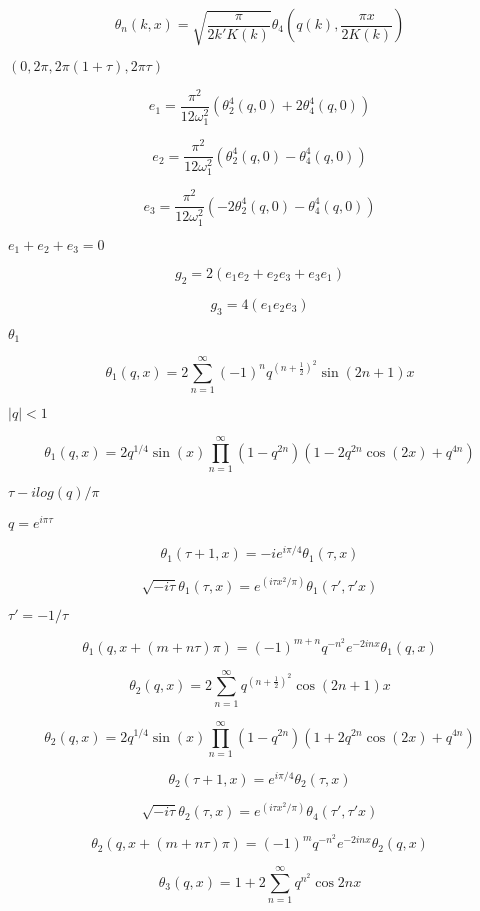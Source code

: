 \documentclass{article}
\begin{document}
\[ \theta_n(k,x) = \sqrt{\frac{\pi}{2k'K(k)}} \theta_4\left(q(k),\frac{\pi x}{2K(k)}\right) \]
\pagebreak

$ (0, 2\pi, 2\pi (1 + \tau), 2\pi \tau) $
\pagebreak

\[ e_1 = \frac{\pi^2}{12\omega_1^2}(\theta_2^4(q,0) + 2\theta_4^4(q,0)) \]
\pagebreak

\[ e_2 = \frac{\pi^2}{12\omega_1^2}(\theta_2^4(q,0) - \theta_4^4(q,0)) \]
\pagebreak

\[ e_3 = \frac{\pi^2}{12\omega_1^2}(-2\theta_2^4(q,0) - \theta_4^4(q,0)) \]
\pagebreak

$ e_1 + e_2 + e_3 = 0 $
\pagebreak

\[ g_2 = 2(e_1 e_2 + e_2 e_3 + e_3 e_1) \]
\pagebreak

\[ g_3 = 4(e_1 e_2 e_3) \]
\pagebreak

$ \theta_1 $
\pagebreak

\[ \theta_1(q,x) = 2\sum_{n=1}^{\infty}(-1)^n q^{(n+\frac{1}{2})^2}\sin{(2n+1)x} \]
\pagebreak

$ |q| < 1 $
\pagebreak

\[ \theta_1(q,x) = 2 q^{1/4} \sin(x) \prod_{n=1}^{\infty} (1 - q^{2n})(1 - 2q^{2n}\cos(2x) + q^{4n}) \]
\pagebreak

$ \tau -i log(q)/ \pi $
\pagebreak

$ q = e^{i\pi\tau} $
\pagebreak

\[ \theta_1(\tau+1,x) = -i e^{i\pi/4}\theta_1(\tau,x) \]
\pagebreak

\[ \sqrt{-i\tau}\theta_1(\tau,x) = e^{(i\tau x^2/\pi)}\theta_1(\tau',\tau' x) \]
\pagebreak

$ \tau' = -1/\tau $
\pagebreak

\[ \theta_1(q, x+(m+n\tau)\pi) = (-1)^{m+n}q^{-n^2}e^{-2inx}\theta_1(q, x) \]
\pagebreak

\[ \theta_2(q,x) = 2\sum_{n=1}^{\infty} q^{(n+\frac{1}{2})^2}\cos{(2n+1)x} \]
\pagebreak

\[ \theta_2(q,x) = 2 q^{1/4} \sin(x) \prod_{n=1}^{\infty} (1 - q^{2n})(1 + 2q^{2n}\cos(2x) + q^{4n}) \]
\pagebreak

\[ \theta_2(\tau+1,x) = e^{i\pi/4}\theta_2(\tau,x) \]
\pagebreak

\[ \sqrt{-i\tau}\theta_2(\tau,x) = e^{(i\tau x^2/\pi)}\theta_4(\tau',\tau' x) \]
\pagebreak

\[ \theta_2(q, x + (m+n\tau)\pi) = (-1)^{m}q^{-n^2}e^{-2inx}\theta_2(q, x) \]
\pagebreak

\[ \theta_3(q,x) = 1 + 2\sum_{n=1}^{\infty} q^{n^2}\cos{2nx} \]
\pagebreak
\end{document}

